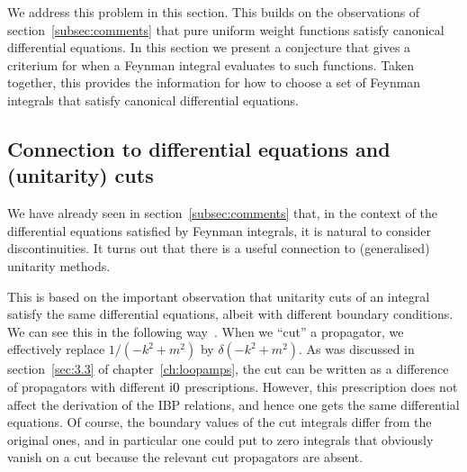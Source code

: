 We address this problem in this section. This builds on the observations of section~\ref{subsec:comments} that pure uniform weight functions satisfy canonical differential equations. In this section we present a conjecture that gives a criterium for when a Feynman integral evaluates to such functions. Taken together, this provides the information for how to choose a set of Feynman integrals that satisfy canonical differential equations.   


\subsection{Connection to differential equations and (unitarity) cuts}
\label{sec:DEandCuts}

We have already seen in section~\ref{subsec:comments} that, in the context of the differential equations satisfied by Feynman integrals, it is natural to consider discontinuities.
It turns out that there is a useful connection to (generalised) unitarity methods.

This is based on the important observation that unitarity cuts of an integral satisfy the same differential
equations, albeit with different boundary conditions.
We can see this in the following way~\cite{ch4Anastasiou:2002yz}.
When we ``cut'' a propagator, we effectively replace $1/(-k^2+m^2)$ by $\delta(-k^2+m^2)$.
As was discussed in section~\ref{sec:3.3} of chapter~\ref{ch:loopamps},
the cut can be written as a difference of propagators with different $\mathrm{i} 0$ prescriptions.
However, this prescription does not affect the derivation of the IBP relations, and hence one gets the same differential equations.
Of course, the boundary values of the cut integrals differ from the original ones, and in particular one could put to zero integrals that obviously vanish on a cut because the relevant cut propagators are absent.

